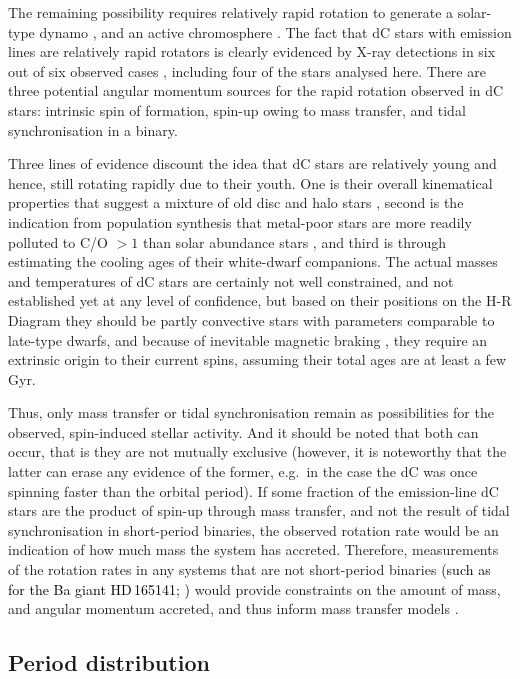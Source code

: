 \documentclass[fleqn,usenatbib,useAMS]{mnras}
\newcommand{\lw}[1]{\textcolor{black}{#1}}
\begin{document}
The remaining possibility requires relatively rapid rotation to generate a solar-type dynamo \citep{Parker55}, and an active chromosphere \citep{chromo}.  The fact that dC stars with emission lines are relatively rapid rotators is clearly evidenced by X-ray detections in six out of six observed cases \citep{Green19}, including four of the stars analysed here.  There are three potential angular momentum sources for the rapid rotation observed in dC stars: intrinsic spin of formation, spin-up owing to mass transfer, and tidal synchronisation in a binary.  

Three lines of evidence discount the idea that dC stars are relatively young and hence, still rotating rapidly due to their youth.  One is their overall kinematical properties that suggest a mixture of old disc and halo stars \citep{Farihi18}, second is the indication from population synthesis that metal-poor stars are more readily polluted to C/O $>1$ than solar abundance stars \citep{Kool95}, and third is through estimating the cooling ages of their white-dwarf companions.  The actual masses and temperatures of dC stars are certainly not well constrained, and not established yet at any level of confidence, but based on their positions on the H-R Diagram they should be partly convective stars with parameters comparable to late-type dwarfs, and because of inevitable magnetic braking \citep{Skum,McQuil}, they require an extrinsic origin to their current spins, assuming their total ages are at least a few Gyr.

Thus, only mass transfer or tidal synchronisation remain as possibilities for the observed, spin-induced stellar activity.  And it should be noted that both can occur, that is they are not mutually exclusive (however, it is noteworthy that the latter can erase any evidence of the former, e.g.\ in the case the dC was once spinning faster than the orbital period).  If some fraction of the emission-line dC stars are the product of spin-up through mass transfer, and not the result of tidal synchronisation in short-period binaries, the observed rotation rate would be an indication of how much mass the system has accreted.  Therefore, measurements of the rotation rates in any systems that are not short-period binaries \lw{(such as for the Ba giant HD\,165141; \citealt{Theuns96})} would provide constraints on the amount of mass, and angular momentum accreted, and thus inform mass transfer models \citep{Izzard10,Mat17}.  

\subsection{Period distribution}
\end{document}
